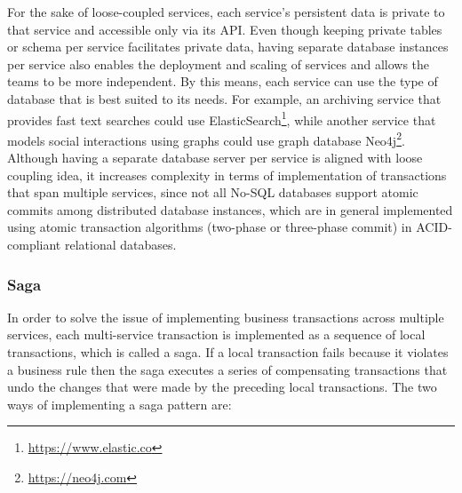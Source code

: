 \documentclass{Configuration_Files/PoliMi3i_thesis}
\begin{document}
For the sake of loose-coupled services, each service’s persistent data is private to that service and accessible only via its API.
Even though keeping private tables or schema per service facilitates private data, having separate database instances per service also enables the deployment and scaling of services and allows the teams to be more independent.
By this means, each service can use the type of database that is best suited to its needs.
For example, an archiving service that provides fast text searches could use ElasticSearch\footnote{\href{https://www.elastic.co}{https://www.elastic.co}}, while
another service that models social interactions using graphs could use graph database Neo4j\footnote{\href{https://neo4j.com}{https://neo4j.com}}.
Although having a separate database server per service is aligned with loose coupling idea, it increases complexity in terms of implementation of transactions that span multiple services, since not all No-SQL databases support atomic commits among distributed database instances, which are in general implemented using atomic transaction algorithms (two-phase or three-phase commit) in ACID-compliant relational databases.

\subsubsection{Saga}
\label{subsubsec:saga}

In order to solve the issue of implementing business transactions across multiple services, each multi-service transaction is implemented as a sequence of local transactions, which is called a saga.
If a local transaction fails because it violates a business rule then the saga executes a series of compensating transactions that undo the changes that were made by the preceding local transactions.
The two ways of implementing a saga pattern are:
\end{document}
